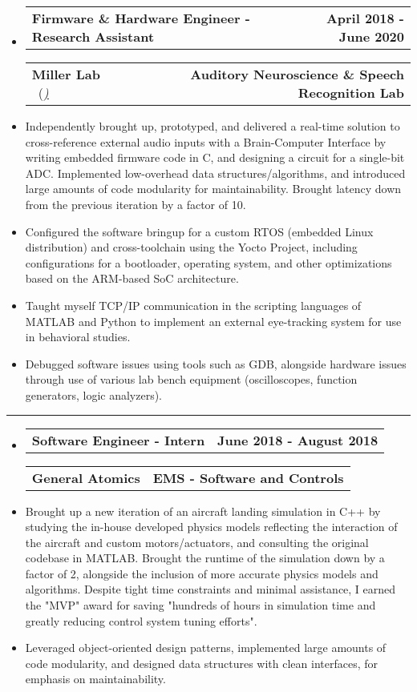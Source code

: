 \documentclass[10pt,letterpaper]{article}
\makeatletter
\newcommand{\header}[2]
{
	\begin{tabular*}{\linewidth}{l @{\extracolsep{\fill}} r}
		\hspace{-27pt} #1 & #2 \\
	\end{tabular*}
}
\makeatother
\begin{document}
\begin{itemize}
	\item[]
		\header
		{\textbf{Firmware \& Hardware Engineer - Research Assistant}} 
		{\textbf{April 2018 - June 2020}}
		\header
		{\textbf{Miller Lab} \ (\href{https://millerlab.faculty.ucdavis.edu}{\small \emph{\underline{\smash{millerlab.faculty.ucdavis.edu})}}} }
		{\textbf{Auditory Neuroscience \& Speech Recognition Lab}} 
	\item
		Independently brought up, prototyped, and delivered a real-time solution to cross-reference external audio inputs with a Brain-Computer Interface by writing embedded firmware code in C, and designing a circuit for a single-bit ADC. Implemented low-overhead data structures/algorithms, and introduced large amounts of code modularity for maintainability. Brought latency down from the previous iteration by a factor of 10. 
	\item 
		Configured the software bringup for a custom RTOS (embedded Linux distribution) and cross-toolchain using the Yocto Project, including configurations for a bootloader, operating system, and other optimizations based on the ARM-based SoC architecture. 
	\item 
		Taught myself TCP/IP communication in the scripting languages of MATLAB and Python to implement an external eye-tracking system for use in behavioral studies.
	\item 
		Debugged software issues using tools such as GDB, alongside hardware issues through use of various lab bench equipment (oscilloscopes, function generators, logic analyzers).
\end{itemize}

\hrule

\begin{itemize}
	\item[]
		\header
		{\textbf{Software Engineer - Intern}} 
		{\textbf{June 2018 - August 2018}}
		\header
		{\textbf{General Atomics}}
		{\textbf{EMS - Software and Controls}} 
	\item
		Brought up a new iteration of an aircraft landing simulation in C++ by studying the in-house developed physics models reflecting the interaction of the aircraft and custom motors/actuators, and consulting the original codebase in MATLAB. Brought the runtime of the simulation down by a factor of 2, alongside the inclusion of more accurate physics models and algorithms. Despite tight time constraints and minimal assistance, I earned the "MVP" award for saving "hundreds of hours in simulation time and greatly reducing control system tuning efforts". 

	\item
		Leveraged object-oriented design patterns, implemented large amounts of code modularity, and designed data structures with clean interfaces, for emphasis on maintainability.


\end{itemize}
\end{document}
